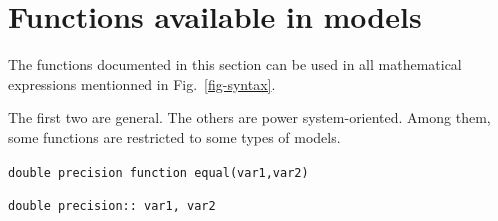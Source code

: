 \section{Functions available in models}

The functions documented in this section can be used in all mathematical expressions mentionned in Fig.~\ref{fig-syntax}.

The first two are general. The others are power system-oriented. Among them, some functions are restricted to some types of models.

\vspace*{2ex}

{\large \tt double precision function equal(var1,var2)}

\hspace*{10ex} {\tt double precision:: var1, var2}

